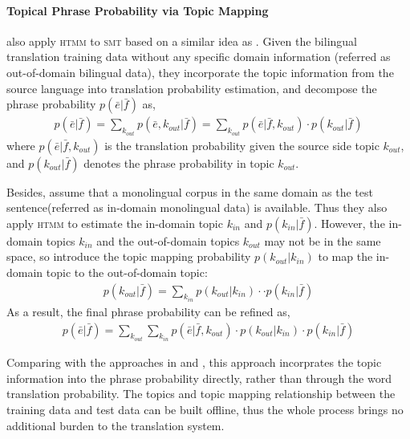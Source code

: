 
\paragraph{Topical Phrase Probability via Topic Mapping}

\citet{su-12} also apply \textsc{htmm} to \textsc{smt} based on a similar idea as \citet{Eidelman-12}. Given the bilingual translation training data without any specific domain information (referred as out-of-domain bilingual data), they incorporate the topic information from the source language into translation probability estimation, and decompose the phrase probability $p(\bar{e}|\bar{f})$ as,
\begin{align}
p(\bar{e}|\bar{f}) = \sum_{k_{out}} p(\bar{e}, k_{out} | \bar{f}) = \sum_{k_{out}} p(\bar{e} | \bar{f}, k_{out}) \cdot p(k_{out} | \bar{f})
\end{align}
where $p(\bar{e} | \bar{f}, k_{out})$ is the translation probability given the source side topic $k_{out}$, and $p(k_{out} | \bar{f})$ denotes the phrase probability in topic $k_{out}$.

Besides, \citet{su-12} assume that a monolingual corpus in the same domain as the test sentence(referred as in-domain monolingual data) is available. Thus they also apply \textsc{htmm} to estimate the in-domain topic $k_{in}$ and $p(k_{in} | \bar{f})$. 
However, the in-domain topics $k_{in}$ and the out-of-domain topics $k_{out}$ may not be in the same space, so \citet{su-12} introduce the topic mapping probability $p(k_{out} | k_{in})$ to map the in-domain topic to the out-of-domain topic:
\begin{align}
p(k_{out} | \bar{f}) = \sum_{k_{in}} p(k_{out} | k_{in}) \cdot \cdot p(k_{in} | \bar{f})
\end{align}
As a result, the final phrase probability can be refined as,
\begin{align}
p(\bar{e}|\bar{f}) = \sum_{k_{out}} \sum_{k_{in}} p(\bar{e} | \bar{f}, k_{out}) \cdot p(k_{out} | k_{in}) \cdot p(k_{in} | \bar{f})
\end{align}

Comparing with the approaches in \citet{Eidelman-12} and \citet{hasler-12}, this approach incorprates the topic information into the phrase probability directly, rather than through the word translation probability. The topics and topic mapping relationship between the training data and test data can be built offline, thus the whole process brings no additional burden to the translation system. 

